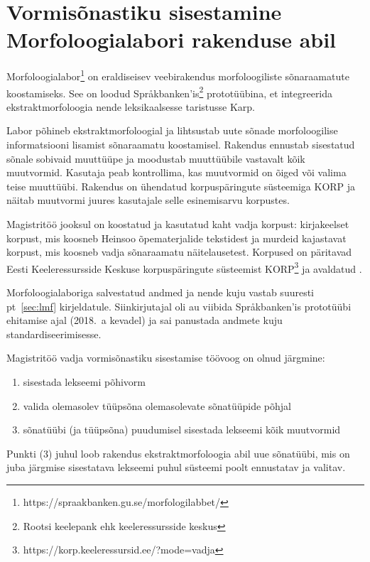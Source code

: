\documentclass[12pt,a4paper]{article}
\begin{document}
\newpage

\section{Vormisõnastiku sisestamine Morfoloogialabori rakenduse abil}
\label{sec:vormisõnastiku-sisestamine}

Morfoloogialabor\footnote{https://spraakbanken.gu.se/morfologilabbet/} on eraldiseisev veebi\-rakendus morfoloogiliste sõnaraamatute koostamiseks. See on loodud Språkbanken'is\footnote{Rootsi keelepank ehk keele\-ressursside keskus} prototüübina, et integreerida ekstraktmorfoloogia nende leksikaalsesse taristusse Karp.

Labor põhineb ekstraktmorfoloogial ja lihtsustab uute sõnade morfoloogilise informatsiooni lisamist sõnaraamatu koostamisel. Rakendus ennustab sisestatud sõnale sobivaid muuttüüpe ja moodustab muuttüübile vastavalt kõik muutvormid. Kasutaja peab kontrollima, kas muutvormid on õiged või valima teise muuttüübi.  Rakendus on ühendatud korpuspäringute süsteemiga KORP ja näitab muutvormi juures kasutajale selle esinemis\-arvu korpustes. %

Magistritöö jooksul on koostatud ja kasutatud kaht vadja korpust: kirjakeelset korpust, mis koosneb Heinsoo õpematerjalide tekstidest ja murdeid kajastavat korpust, mis koosneb vadja sõnaraamatu \cite{grunberg_vadja_2013} näitelausetest. Korpused on päritavad Eesti Keeleressursside Keskuse korpuspäringute süsteemist KORP\footnote{https://korp.keeleressursid.ee/?mode=vadja} ja avaldatud \cite{kankainen_keeleleek/votic-corpora:_2018}.

Morfoloogialaboriga salvestatud andmed ja nende kuju vastab suuresti pt~\ref{sec:lmf} kirjeldatule. Siinkirjutajal oli au viibida Språkbanken'is prototüübi ehitamise ajal (2018.~a kevadel) ja sai panustada andmete kuju standardiseerimisesse.


Magistritöö vadja vormisõnastiku sisestamise töövoog on olnud järgmine:
\begin{enumerate}
\item sisestada lekseemi põhivorm
\item valida olemasolev tüüpsõna olemas\-olevate sõnatüüpide põhjal
\item sõnatüübi (ja tüüpsõna) puudumisel sisestada lekseemi kõik muutvormid
\end{enumerate}

Punkti (3) juhul loob rakendus ekstrakt\-morfoloogia abil uue sõnatüübi, mis on juba järgmise sisestatava lekseemi puhul süsteemi poolt ennustatav ja valitav.
\end{document}

